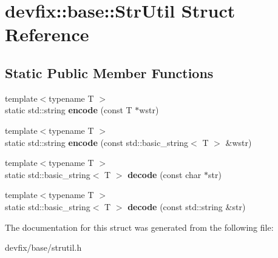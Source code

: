 \hypertarget{structdevfix_1_1base_1_1StrUtil}{}\section{devfix\+:\+:base\+:\+:Str\+Util Struct Reference}
\label{structdevfix_1_1base_1_1StrUtil}
\subsection*{Static Public Member Functions}
\begin{DoxyCompactItemize}
\item 
\mbox{\label{structdevfix_1_1base_1_1StrUtil_adb5dadacfd3e527cc67058fde707899b}} 
{\footnotesize template$<$typename T $>$ }\\static std\+::string {\bfseries encode} (const T $\ast$wstr)
\item 
\mbox{\label{structdevfix_1_1base_1_1StrUtil_a5d808d3c917eabba096d6be3ee7240fc}} 
{\footnotesize template$<$typename T $>$ }\\static std\+::string {\bfseries encode} (const std\+::basic\+\_\+string$<$ T $>$ \&wstr)
\item 
\mbox{\label{structdevfix_1_1base_1_1StrUtil_a35e3c040957142718d3ad926e2a707b5}} 
{\footnotesize template$<$typename T $>$ }\\static std\+::basic\+\_\+string$<$ T $>$ {\bfseries decode} (const char $\ast$str)
\item 
\mbox{\label{structdevfix_1_1base_1_1StrUtil_aa1ff550d7df20a6f2b69c211b88720fe}} 
{\footnotesize template$<$typename T $>$ }\\static std\+::basic\+\_\+string$<$ T $>$ {\bfseries decode} (const std\+::string \&str)
\end{DoxyCompactItemize}


The documentation for this struct was generated from the following file\+:\begin{DoxyCompactItemize}
\item 
devfix/base/strutil.\+h\end{DoxyCompactItemize}
